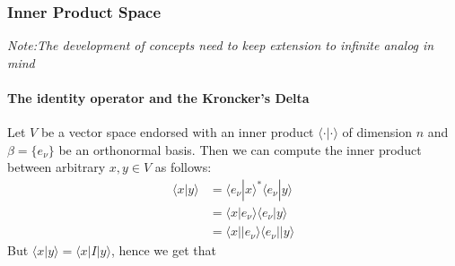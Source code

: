 \subsubsection{Inner Product Space}

%
\providecommand{\argmin}{\operatorname*{arg\,min}}%
\providecommand{\argmax}{\operatorname*{arg\,max}}%
\textit{Note:The development of concepts need to keep extension to infinite analog in mind}

\paragraph{The identity operator and the Kroncker's Delta}

Let $V$ be a vector space endorsed with an inner product $\langle\cdot| \cdot \rangle$ of dimension $n$ and $\beta = \{e_\nu\}$ be an orthonormal basis. Then we can compute the inner product between arbitrary $x,y\in V$ as follows:
\begin{equation}
\begin{aligned}
\langle x | y \rangle  &= \langle e_{\nu} | x \rangle^* \langle e_{\nu} | y\rangle \\ 
&= \langle x | e_{\nu} \rangle \langle e_{\nu} | y\rangle \\
&= \langle x \lvert |e_{\nu} \rangle \langle e_{\nu}|  \rvert y\rangle
\end{aligned}
\end{equation}
But $\langle x | y \rangle = \langle x | I | y \rangle$, hence we get that

